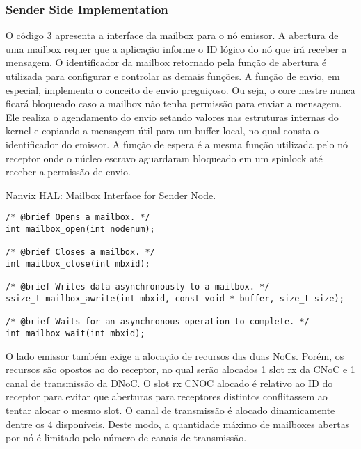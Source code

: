 			\subsubsection{Sender Side Implementation}

				O código 3 apresenta a interface da mailbox para o nó emissor.
				A abertura de uma mailbox requer que a aplicação informe o ID lógico do nó que irá receber a mensagem.
				O identificador da mailbox retornado pela função de abertura é utilizada para configurar e controlar as demais funções.
				A função de envio, em especial, implementa o conceito de envio preguiçoso.
				Ou seja, o core mestre nunca ficará bloqueado caso a mailbox não tenha permissão para enviar a mensagem.
				Ele realiza o agendamento do envio setando valores nas estruturas internas do kernel e copiando a mensagem útil para um buffer local, no qual consta o identificador do emissor.
				A função de espera é a mesma função utilizada pelo nó receptor onde o núcleo escravo aguardaram bloqueado em um spinlock até receber a permissão de envio.


\begin{listing}[!tb]
\caption{Nanvix HAL: Mailbox Interface for Sender Node.}
\label{code:hal-mailbox-sender}
\begin{verbatim}
/* @brief Opens a mailbox. */
int mailbox_open(int nodenum);

/* @brief Closes a mailbox. */
int mailbox_close(int mbxid);

/* @brief Writes data asynchronously to a mailbox. */
ssize_t mailbox_awrite(int mbxid, const void * buffer, size_t size);

/* @brief Waits for an asynchronous operation to complete. */
int mailbox_wait(int mbxid);
\end{verbatim}
\end{listing}

				O lado emissor também exige a alocação de recursos das duas NoCs.
				Porém, os recursos são opostos ao do receptor, no qual serão alocados 1 slot rx da CNoC e 1 canal de transmissão da DNoC.
				O slot rx CNOC alocado é relativo ao ID do receptor para evitar que aberturas para receptores distintos conflitassem ao tentar alocar o mesmo slot.
				O canal de transmissão é alocado dinamicamente dentre os 4 disponíveis.
				Deste modo, a quantidade máximo de mailboxes abertas por nó é limitado pelo número de canais de transmissão.

